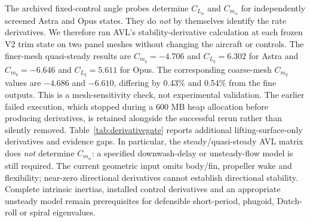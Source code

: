 \documentclass[10pt,letterpaper]{article}
\begin{document}
The archived fixed-control angle probes determine $C_{L_\alpha}$ and $C_{m_\alpha}$ for independently screened Astra and Opus states. They do \emph{not} by themselves identify the rate derivatives. We therefore ran AVL's stability-derivative calculation at each frozen V2 trim state on two panel meshes without changing the aircraft or controls. The finer-mesh quasi-steady results are $C_{m_q}=-4.706$ and $C_{L_q}=6.302$ for Astra and $C_{m_q}=-6.646$ and $C_{L_q}=5.611$ for Opus. The corresponding coarse-mesh $C_{m_q}$ values are $-4.686$ and $-6.610$, differing by 0.43\% and 0.54\% from the fine outputs. This is a mesh-sensitivity check, not experimental validation. The earlier failed execution, which stopped during a 600 MB heap allocation before producing derivatives, is retained alongside the successful rerun rather than silently removed. Table~\ref{tab:derivativegate} reports additional lifting-surface-only derivatives and evidence gaps. In particular, the steady/quasi-steady AVL matrix does \emph{not} determine $C_{m_{\dot\alpha}}$: a specified downwash-delay or unsteady-flow model is still required. The current geometric input omits body/fin, propeller wake and flexibility; near-zero directional derivatives cannot establish directional stability. Complete intrinsic inertias, installed control derivatives and an appropriate unsteady model remain prerequisites for defensible short-period, phugoid, Dutch-roll or spiral eigenvalues.
\end{document}
